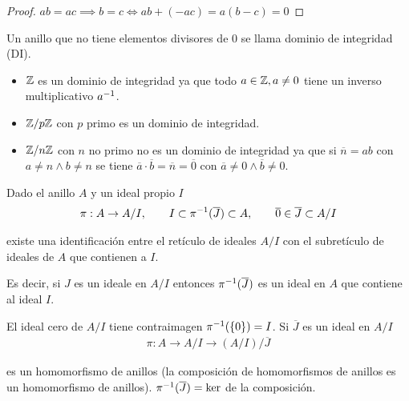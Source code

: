 \begin{proof}
	$ab = ac \implies b = c \iff ab + (-ac) = a(b -c) = 0$
\end{proof}

\begin{dfn}
	Un anillo que no tiene elementos divisores de 0 se llama dominio de integridad (DI).
\end{dfn}

\begin{ej}
	\begin{itemize}
		\item $\mathbb{Z}$ es un dominio de integridad ya que todo $a \in \mathbb{Z}, a \neq 0$ tiene un inverso multiplicativo $a^{-1}$.
		\item $\mathbb{Z}/p\mathbb{Z}$ con $p$ primo es un dominio de integridad.
		\item $\mathbb{Z}/n\mathbb{Z}$ con $n$ no primo no es un dominio de integridad ya que si $\overline n = ab$ con $a \neq n \land b \neq n$ se tiene $\overline{a} \cdot \overline{b} = \overline{n} = \overline{0}$ con $\overline{a} \neq 0 \land \overline{b} \neq 0$.
	\end{itemize}
\end{ej}


\begin{thm}
	Dado el anillo $A$ y un ideal propio $I$
	\begin{align*}
		\pi: A \to A/I,\qquad I \subset \pi^{-1}(\overline{J}) \subset A,\qquad \overline{0} \in \overline{J} \subset A / I
	\end{align*}
	
	existe una identificación entre el retículo de ideales $A / I$ con el subretículo de ideales de $A$ que contienen a $I$. 
	
	Es decir, si $J$ es un ideale en $A/I$ entonces $\pi^{-1}(\overline{J})$ es un ideal en $A$ que contiene al ideal $I$.
\end{thm}


El ideal cero de $A/I$ tiene contraimagen $\pi^{-1}(\{0\}) = I$. Si $\overline{J}$ es un ideal en $A/I$
\begin{align*}
	\pi : A \to A/I \to (A/I) / \overline{J}
\end{align*}

es un homomorfismo de anillos (la composición de homomorfismos de anillos es un homomorfismo de anillos). $\pi^{-1}(\overline{J}) = \ker$ de la composición.